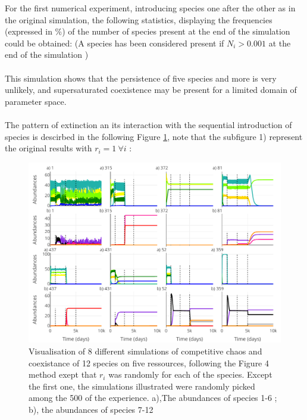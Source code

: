 For the first numerical experiment, introducing species one after the other as in the 
original simulation, the following statistics, displaying the frequencies 
(expressed in \%) of the number of species present at the end of the simulation 
could be obtained: (A species has been considered present if $N_i > 0.001$ at 
the end of the simulation )\\


\\
This simulation shows that the persistence of five species and more is 
very unlikely, and supersaturated coexistence may be present for a limited domain of parameter space.\\
\\
The pattern of extinction an its interaction with the sequential introduction of 
species is descirbed in the following Figure \ref{figures:Figexp1}, note that 
the subfigure 1) represent the original results with $r_i=1 ~\forall i$ : 
\begin{figure}[H]
\begin{center} 
 \includegraphics[width=1\textwidth]{../Code/Figures/Figure_exp1.pdf}
  \caption{Visualisation of 8 different simulations of competitive chaos and 
coexistance of 12 species on five ressources, following the Figure 4 method 
exept that $r_i$ was randomly for each of the species. Except the first one, the 
simulations illustrated were randomly picked among the 500 of the experience. 
a),The abundances of species 1-6 ; b), the abundances of species 7-12}
  \label{figures:Figexp1}
\end{center}
\end{figure}
